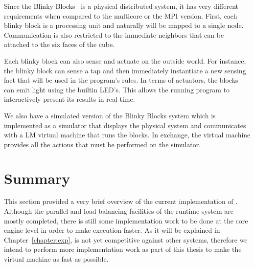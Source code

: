 Since the Blinky Blocks~\cite{Kirby-chi11} is a physical distributed system, it has very different requirements when compared to the multicore
or the MPI version. First, each blinky block is a processing unit and naturally will be mapped to a single node. Communication is also restricted
to the immediate neighbors that can be attached to the six faces of the cube.

Each blinky block can also sense and actuate on the outside world. For instance, the blinky block can sense a tap and then immediately instantiate
a new sensing fact that will be used in the program's rules. In terms of actuators, the blocks can emit light using the builtin LED's.
This allows the running program to interactively present its results in real-time.

We also have a simulated version of the Blinky Blocks system which is implemented as a simulator that displays the physical system and
communicates with a LM virtual machine that runs the blocks. In exchange, the virtual machine provides all the actions that must be performed
on the simulator.

\section{Summary}

This section provided a very brief overview of the current implementation of \lang. Although the parallel and load balancing facilities of the
runtime system are mostly completed, there is still some implementation work to be done at the core engine level in order to make execution faster.
As it will be explained in Chapter~\ref{chapter:exp}, \lang is not yet competitive against other systems, therefore we intend to perform more
implementation work as part of this thesis to make the virtual machine as fast as possible.

